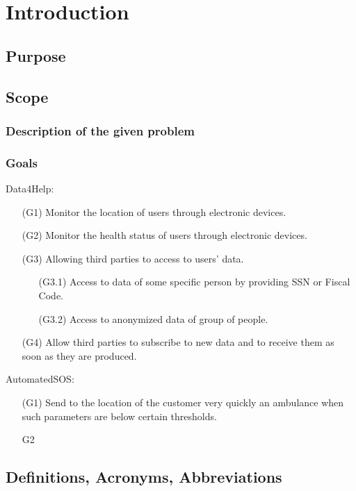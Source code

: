 \section{Introduction}
\subsection{Purpose}
\subsection{Scope}
\subsubsection{Description of the given problem}
\subsubsection{Goals}

Data4Help:  
\begin{itemize}
    \item [(G1)] Monitor the location of users through electronic devices.
    \item [(G2)] Monitor the health status of users through electronic devices.
    \item [(G3)] Allowing third parties to access to users' data.
    \begin{itemize}
        \item [(G3.1)] Access to data of some specific person by providing SSN or Fiscal Code.
        \item [(G3.2)] Access to anonymized data of group of people.
    \end{itemize}
    \item [(G4)] Allow third parties to subscribe to new data and to receive them as soon as they are produced.
    
   
\end{itemize}  
\noindent
AutomatedSOS:
\begin{itemize}
    \item [(G1)] Send to the location of the customer very quickly an ambulance when such parameters are below certain thresholds. 
    \item [G2] 
\end{itemize}

\subsection{Definitions, Acronyms, Abbreviations}

